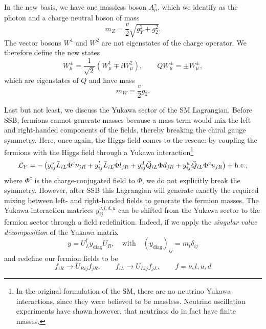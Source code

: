 In the new basis, we have one massless boson $A^\gamma_\mu$, which we identify as the photon and a charge neutral boson of mass
\begin{equation}
m_Z = \frac{v}{2} \sqrt{g_Y^2 + g_2^2}.
\end{equation}
The vector bosons $W^1$ and $W^2$ are not eigenstates of the charge operator. We therefore define the new states
\begin{equation}
W^\pm_\mu = \frac{1}{\sqrt{2}} \left( W^1_\mu \mp i W^2_\mu \right), \qquad Q W_\mu^\pm = \pm W_\mu^\pm,
\end{equation}
which are eigenstates of $Q$ and have mass
\begin{equation}
m_W = \frac{v}{2} g_2.
\end{equation}

Last but not least, we discuss the Yukawa sector of the \acs{SM} Lagrangian. Before \acs{SSB}, fermions cannot generate masses because a mass term would mix the left- and right-handed components of the fields, thereby breaking the chiral gauge symmetry. Here, once again, the Higgs field comes to the rescue: by coupling the fermions with the Higgs field through a Yukawa interaction\footnote{In the original formulation of the \acs{SM}, there are no neutrino Yukawa interactions, since they were believed to be massless. Neutrino oscillation experiments have shown however, that neutrinos do in fact have finite masses.}
\begin{equation}
\mathcal{L}_Y = - \left( y_{ij}^\nu \bar{L}_{iL} \Phi^c \nu_{jR} + y_{ij}^l \bar{L}_{iL} \Phi l_{jR} + y_{ij}^d \bar{Q}_{iL} \Phi d_{jR} + y_{ij}^u \bar{Q}_{iL} \Phi^c u_{jR} \right) + \mathrm{h.c.},
\end{equation}
where $\Phi^c$ is the charge-conjugated field to $\Phi$, we do not explicitly break the symmetry. However, after \acs{SSB} this Lagrangian will generate exactly the required mixing between left- and right-handed fields to generate the fermion masses. The Yukawa-interaction matrices $y_{ij}^{\nu,l, d, u}$ can be shifted from the Yukawa sector to the fermion sector through a field redefinition. Indeed, if we apply the \textit{singular value decomposition} of the Yukawa matrix
\begin{equation}
y = U_L^\dagger y_{\mathrm{diag}} U_R, \quad \text{with} \quad (y_{\mathrm{diag}})_{ij} = m_i \delta_{ij}
\end{equation}
and redefine our fermion fields to be
\begin{equation}
f_{iR} \longrightarrow U_{Rij} f_{jR}, \qquad f_{iL} \longrightarrow U_{Lij} f_{jL}, \qquad f = \nu, l, u, d
\end{equation}
